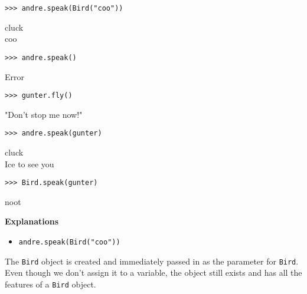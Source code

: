 \newpage
\begin{blocksection}
\vspace{9\baselineskip}
\begin{lstlisting}
>>> andre.speak(Bird("coo"))
\end{lstlisting}
\begin{solution}[.2in]
cluck \\
coo
\end{solution}

\vspace{3\baselineskip}
\begin{lstlisting}
>>> andre.speak()
\end{lstlisting}
\begin{solution}[.2in]
Error
\end{solution}

\vspace{3\baselineskip}
\begin{lstlisting}
>>> gunter.fly()
\end{lstlisting}
\begin{solution}[.2in]
"Don't stop me now!"
\end{solution}

\vspace{3\baselineskip}
\begin{lstlisting}
>>> andre.speak(gunter)
\end{lstlisting}
\begin{solution}[.2in]
cluck \\
Ice to see you
\end{solution}

\vspace{3\baselineskip}
\begin{lstlisting}
>>> Bird.speak(gunter)
\end{lstlisting}
\begin{solution}[.2in]
noot
\end{solution}
\end{blocksection}
\onecolumn

\begin{solution}[-32pt]
\begin{blocksection}
\textbf{Explanations}

\begin{itemize}
    \item \lstinline{andre.speak(Bird("coo"))}
\end{itemize}
The \lstinline{Bird} object is created and immediately passed in as the parameter for \lstinline{Bird}. Even though we don't assign it to a variable, the object still exists and has all the features of a \lstinline{Bird} object.
\end{blocksection}
\end{solution}

